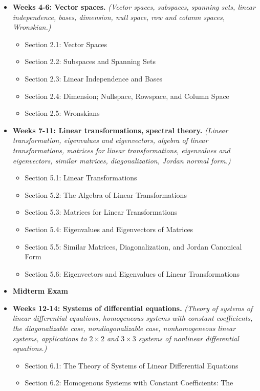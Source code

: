 \documentclass[10pt]{article}
\theoremstyle{definition}
\begin{document}
\begin{itemize}
  \item \textbf{Weeks 4-6: Vector spaces.} \textit{(Vector spaces, subspaces, spanning
  sets, linear independence, bases, dimension, null space, row and column
  spaces, Wronskian.)}
  \begin{itemize}
    \item Section 2.1: Vector Spaces
    \item Section 2.2: Subspaces and Spanning Sets
    \item Section 2.3: Linear Independence and Bases
    \item Section 2.4: Dimension; Nullspace, Rowspace, and Column Space
    \item Section 2.5: Wronskians
  \end{itemize}
  \item \textbf{Weeks 7-11: Linear transformations, spectral theory.} \textit{(Linear
  transformation, eigenvalues and eigenvectors, algebra of linear
  transformations, matrices for linear transformations, eigenvalues and
  eigenvectors, similar matrices, diagonalization, Jordan normal form.)}
  \begin{itemize}
    \item Section 5.1: Linear Transformations
    \item Section 5.2: The Algebra of Linear Transformations
    \item Section 5.3: Matrices for Linear Transformations
    \item Section 5.4: Eigenvalues and Eigenvectors of Matrices
    \item Section 5.5: Similar Matrices, Diagonalization, and Jordan Canonical Form
    \item Section 5.6: Eigenvectors and Eigenvalues of Linear Transformations
  \end{itemize}
  \item \textbf{Midterm Exam}
  \item \textbf{Weeks 12-14: Systems of differential equations.} \textit{(Theory of
  systems of linear differential equations, homogeneous systems with constant
  coefficients, the diagonalizable case, nondiagonalizable case,
  nonhomogeneous linear systems, applications to $2\times 2$ and $3\times 3$
  systems of nonlinear differential equations.)}
  \begin{itemize}
    \item Section 6.1: The Theory of Systems of Linear Differential Equations
    \item Section 6.2: Homogenous Systems with Constant Coefficients: The

\end{itemize}
\end{itemize}
\end{document}
